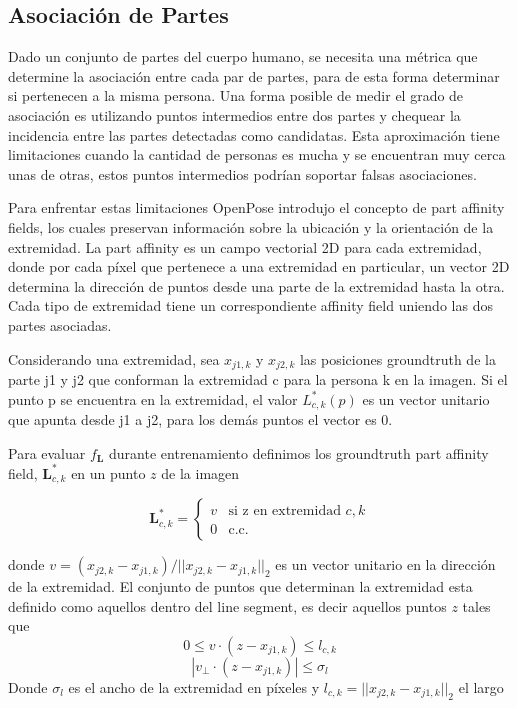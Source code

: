 \documentclass[runningheads]{llncs}
\begin{document}
\subsection{Asociación de Partes}
Dado un conjunto de partes del cuerpo humano, se necesita una métrica que determine la asociación entre cada par de partes, para de esta forma determinar si pertenecen a la misma persona. Una forma posible de medir el grado de asociación es utilizando puntos intermedios entre dos partes y chequear la incidencia entre las partes detectadas como candidatas. Esta aproximación tiene limitaciones cuando la cantidad de personas es mucha y se encuentran muy cerca unas de otras, estos puntos intermedios podrían soportar falsas asociaciones.

Para enfrentar estas limitaciones OpenPose introdujo el concepto de part affinity fields, los cuales preservan información sobre la ubicación y la orientación de la extremidad. La part affinity es un campo vectorial 2D para cada extremidad, donde por cada píxel que pertenece a una extremidad en particular, un vector 2D determina la dirección de puntos desde una parte de la extremidad hasta la otra. Cada tipo de extremidad tiene un correspondiente affinity field uniendo las dos partes asociadas.

Considerando una extremidad, sea $x_{j1,k}$ y $x_{j2,k}$ las posiciones groundtruth de la parte j1 y j2 que conforman la extremidad c para la persona k en la imagen. Si el punto p se encuentra en la extremidad, el valor $L^{*}_{c,k}(p)$ es un vector unitario que apunta desde j1 a j2, para los demás puntos el vector es 0.

Para evaluar $f_{\textbf{L}}$ durante entrenamiento definimos los groundtruth part affinity field, $\textbf{L}_{c,k}^*$ en un punto $z$ de la imagen

\begin{equation}
\textbf{L}_{c,k}^* = \begin{cases}
v &\text{si z en extremidad $c,k$}\\
0 &\text{c.c.}
\end{cases}
\end{equation}

donde $v = (x_{j2,k}-x_{j1,k})/||x_{j2,k}-x_{j1,k}||_2$ es un vector unitario en la dirección de la extremidad. El conjunto de puntos que determinan la extremidad esta definido como aquellos dentro del line segment, es decir aquellos puntos $z$ tales que 
\begin{equation}
0 \le v \cdot (z - x_{j1,k}) \le l_{c,k}
\end{equation}
\begin{equation}
|v_{\perp} \cdot (z - x_{j1,k})| \le \sigma_{l}
\end{equation}
Donde $\sigma_{l}$ es el ancho de la extremidad en píxeles y $l_{c,k}=||x_{j2,k}-x_{j1,k}||_2$ el largo
\end{document}
